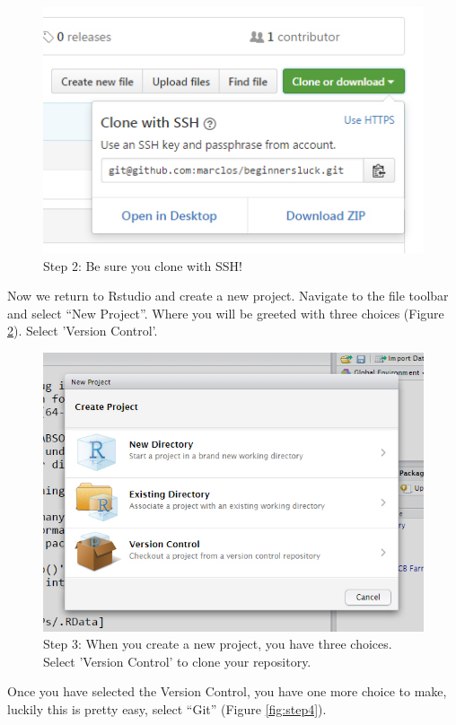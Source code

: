 \documentclass[12pt]{../SOP3_beta}
\begin{document}
\begin{figure}
\includegraphics{graphics/CloningGithub2.jpg}
\caption{Step 2: Be sure you clone with SSH!}
\label{fig:step2}
\end{figure}

\NP Now we return to Rstudio and create a new project. Navigate to the file toolbar and select ``New Project''. Where you will be greeted with three choices (Figure \ref{fig:step3}). Select 'Version Control'. 
\begin{figure}
\includegraphics{graphics/RstudioNewProject.jpg}
\caption{Step 3: When you create a new project, you have three choices. Select 'Version Control' to clone your repository.}
\label{fig:step3}
\end{figure}

\NP Once you have selected the Version Control, you have one more choice to make, luckily this is pretty easy, select ``Git'' (Figure \ref{fig:step4}).
\end{document}
